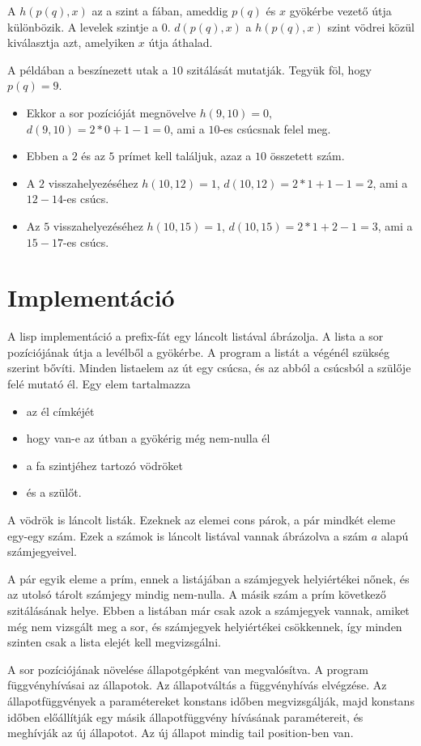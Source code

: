 \documentclass{article}
\begin{document}
A $h(p(q), x)$ az a szint a fában, ameddig $p(q)$ és $x$ gyökérbe vezető útja különbözik.
A levelek szintje a $0$.
$d(p(q), x)$ a $h(p(q), x)$ szint vödrei közül kiválasztja azt, amelyiken $x$ útja áthalad.

A példában a beszínezett utak a $10$ szitálását mutatják.
Tegyük föl, hogy $p(q)=9$.
\begin{itemize}
\item Ekkor a sor pozícióját megnövelve $h(9, 10)=0$,
$d(9, 10)=2*0+1-1=0$, ami a $10$-es csúcsnak felel meg.
\item Ebben a $2$ és az $5$ prímet kell találjuk, azaz a $10$ összetett szám.
\item A $2$ visszahelyezéséhez $h(10, 12)=1$, $d(10, 12)=2*1+1-1=2$, ami a $12-14$-es csúcs.
\item Az $5$ visszahelyezéséhez $h(10, 15)=1$, $d(10, 15)=2*1+2-1=3$, ami a $15-17$-es csúcs.
\end{itemize}

\section{Implementáció}

A lisp implementáció a prefix-fát egy láncolt listával ábrázolja.
A lista a sor pozíciójának útja a levélből a gyökérbe.
A program a listát a végénél szükség szerint bővíti.
Minden listaelem az út egy csúcsa, és az abból a csúcsból a szülője felé mutató él.
Egy elem tartalmazza
\begin{itemize}
\item az él címkéjét
\item hogy van-e az útban a gyökérig még nem-nulla él
\item a fa szintjéhez tartozó vödröket
\item és a szülőt.
\end{itemize}

A vödrök is láncolt listák. Ezeknek az elemei cons párok, a pár mindkét eleme egy-egy szám. Ezek a számok is láncolt listával vannak ábrázolva a szám $a$ alapú számjegyeivel.

A pár egyik eleme a prím, ennek a listájában a számjegyek helyiértékei nőnek, és az utolsó tárolt számjegy mindig nem-nulla.
A másik szám a prím következő szitálásának helye.
Ebben a listában már csak azok a számjegyek vannak, amiket még nem vizsgált meg a sor, és számjegyek helyiértékei csökkennek, így minden szinten csak a lista elejét kell megvizsgálni.

A sor pozíciójának növelése állapotgépként van megvalósítva.
A program függvényhívásai az állapotok.
Az állapotváltás a függvényhívás elvégzése.
Az állapotfüggvények a paramétereket konstans időben megvizsgálják,
majd konstans időben előállítják egy másik állapotfüggvény hívásának paramétereit, és meghívják az új állapotot.
Az új állapot mindig tail position-ben van.
\end{document}

